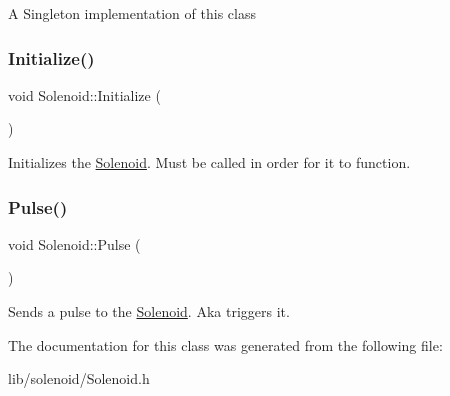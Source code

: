 A Singleton implementation of this class \hypertarget{class_solenoid_a6093fb381f87eee3e22c6dfc97f3fdc0}{}\label{class_solenoid_a6093fb381f87eee3e22c6dfc97f3fdc0} 
\subsubsection{\texorpdfstring{Initialize()}{Initialize()}}
{\footnotesize\ttfamily void Solenoid\+::\+Initialize (\begin{DoxyParamCaption}{ }\end{DoxyParamCaption})}

Initializes the \hyperlink{class_solenoid}{Solenoid}. Must be called in order for it to function. \hypertarget{class_solenoid_a50bc0121679bd1ff11323f1c88fe2ec6}{}\label{class_solenoid_a50bc0121679bd1ff11323f1c88fe2ec6} 
\subsubsection{\texorpdfstring{Pulse()}{Pulse()}}
{\footnotesize\ttfamily void Solenoid\+::\+Pulse (\begin{DoxyParamCaption}{ }\end{DoxyParamCaption})}

Sends a pulse to the \hyperlink{class_solenoid}{Solenoid}. Aka triggers it. 

The documentation for this class was generated from the following file\+:\begin{DoxyCompactItemize}
\item 
lib/solenoid/Solenoid.\+h\end{DoxyCompactItemize}
